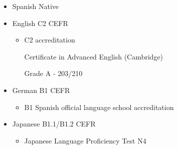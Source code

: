 \documentclass[]{friggeri-cv}
\begin{document}
\begin{itemize}
\setlength\itemsep{-0.4em}
    \item Spanish \hfill { Native}
    \item English \hfill { C2 CEFR}
    \begin{itemize}
        \item C2 accreditation 
        
        Certificate in Advanced English (Cambridge)
        
        Grade A - 203/210 
    \end{itemize}

    \item German \hfill { B1 CEFR}
    \begin{itemize}
        \item B1 Spanish official language school accreditation 
    \end{itemize}
    \item Japanese \hfill { B1.1/B1.2 CEFR}
    \begin{itemize}
        \item Japanese Language Proficiency Test N4
    \end{itemize}
\end{itemize}
\end{document}
